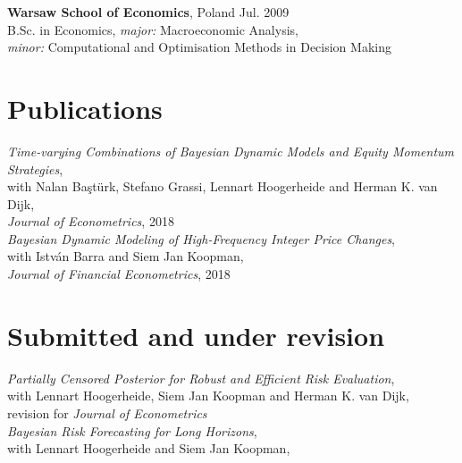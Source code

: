 \documentclass[margin,line]{resume}
\begin{document}
\begin{resume}
 	\textbf{Warsaw School of Economics}, Poland  \hfill  Jul. 2009\\
   	B.Sc. in Economics, \textit{major:} Macroeconomic Analysis,\\ 
    \textit{minor:} Computational and Optimisation Methods in Decision Making\\
    
\vspace{-4mm}
\section{\mysidestyle Publications}
\textit{Time-varying Combinations of Bayesian Dynamic Models and Equity Momentum Strategies},\\
	with Nalan Ba\c{s}t\"{u}rk, Stefano Grassi, Lennart Hoogerheide and Herman K. van Dijk,\\
	\textit{Journal of Econometrics}, 2018 \vspace{1mm} \\
\textit{Bayesian Dynamic Modeling of High-Frequency Integer Price Changes},\\
	with Istv\'{a}n Barra  and Siem Jan Koopman,\\
	\textit{Journal of Financial Econometrics}, 2018  \vspace{-5mm} \\ 
	 	
\section{\mysidestyle Submitted and under revision}	
\textit{Partially Censored Posterior for Robust and Efficient Risk Evaluation},\\
	with Lennart Hoogerheide, Siem Jan Koopman and Herman K. van Dijk,\\
	revision for \textit{Journal of Econometrics} \vspace{1mm}\\ 
\textit{Bayesian Risk Forecasting for Long Horizons},\\
	with Lennart Hoogerheide and Siem Jan Koopman, \vspace{-5mm} \\ 
		 	

\end{resume}
\end{document}
